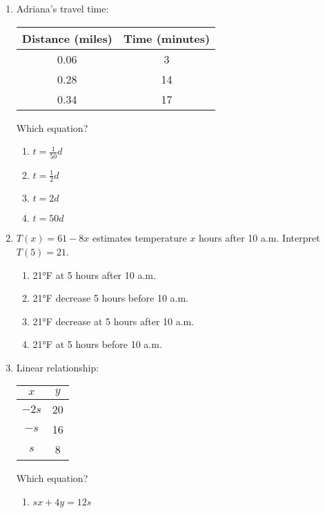 \documentclass[12pt]{exam}
\begin{document}
\begin{enumerate}
\begin{enumerate}[label=\Alph*)]
    \end{enumerate}
    \item Adriana's travel time:
    \begin{center}
        \begin{tabular}{|c|c|}
            \hline
            Distance (miles) & Time (minutes) \\
            \hline
            0.06 & 3 \\
            0.28 & 14 \\
            0.34 & 17 \\
            \hline
        \end{tabular}
    \end{center}
    Which equation?
    \begin{enumerate}[label=\Alph*)]
        \item $t = \frac{1}{50}d$
        \item $t = \frac{1}{2}d$
        \item $t = 2d$
        \item $t = 50d$
    \end{enumerate}
    \item $T(x) = 61 - 8x$ estimates temperature $x$ hours after 10 a.m. Interpret $T(5) = 21$.
    \begin{enumerate}[label=\Alph*)]
        \item 21°F at 5 hours after 10 a.m.
        \item 21°F decrease 5 hours before 10 a.m.
        \item 21°F decrease at 5 hours after 10 a.m.
        \item 21°F at 5 hours before 10 a.m.
    \end{enumerate}
    \item Linear relationship:
    \begin{center}
        \begin{tabular}{|c|c|}
            \hline
            $x$ & $y$ \\
            \hline
            $-2s$ & 20 \\
            $-s$ & 16 \\
            $s$ & 8 \\
            \hline
        \end{tabular}
    \end{center}
    Which equation?
    \begin{enumerate}[label=\Alph*)]
        \item $sx + 4y = 12s$

\end{enumerate}
\end{enumerate}
\end{document}
